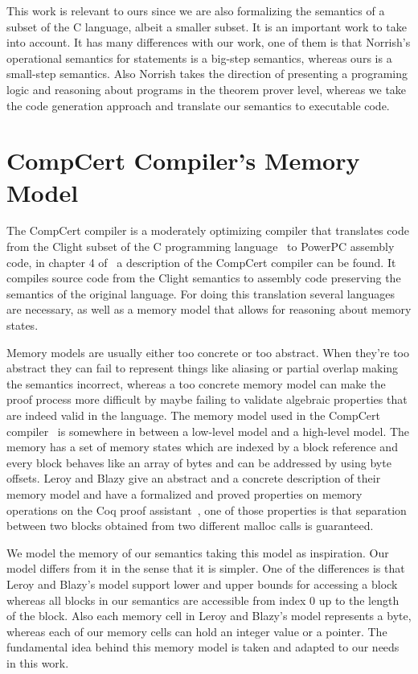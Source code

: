 This work is relevant to ours since we are also formalizing the semantics of a subset of the C language, albeit a smaller subset.
It is an important work to take into account.
It has many differences with our work, one of them is that Norrish's operational semantics for statements is a big-step semantics, whereas ours is a small-step semantics.
Also Norrish takes the direction of presenting a programing logic and reasoning about programs in the theorem prover level, whereas we take the code generation approach and translate our semantics to executable code.


\section{CompCert Compiler's Memory Model}

The CompCert compiler is a moderately optimizing compiler that translates code from the Clight subset of the C programming language~\parencite{clight} to PowerPC assembly code, in chapter 4 of~\parencite{compcert-float-point} a description of the CompCert compiler can be found.
It compiles source code from the Clight semantics to assembly code preserving the semantics of the original language.
For doing this translation several languages are necessary, as well as a memory model that allows for reasoning about memory states.

Memory models are usually either too concrete or too abstract.
When they're too abstract they can fail to represent things like aliasing or partial overlap making the semantics incorrect, whereas a too concrete memory model can make the proof process more difficult by maybe failing to validate algebraic properties that are indeed valid in the language.
The memory model used in the CompCert compiler~\parencite{leroy-blazy-memory-model} is somewhere in between a low-level model and a high-level model.
The memory has a set of memory states which are indexed by a block reference and every block behaves like an array of bytes and can be addressed by using byte offsets.
Leroy and Blazy give an abstract and a concrete description of their memory model and have a formalized and proved properties on memory operations on the Coq proof assistant~\parencite{coq-doc}, one of those properties is that separation between two blocks obtained from two different malloc calls is guaranteed.

We model the memory of our semantics taking this model as inspiration.
Our model differs from it in the sense that it is simpler.
One of the differences is that Leroy and Blazy's model support lower and upper bounds for accessing a block whereas all blocks in our semantics are accessible from index $0$ up to the length of the block.
Also each memory cell in Leroy and Blazy's model represents a byte, whereas each of our memory cells can hold an integer value or a pointer.
The fundamental idea behind this memory model is taken and adapted to our needs in this work.


